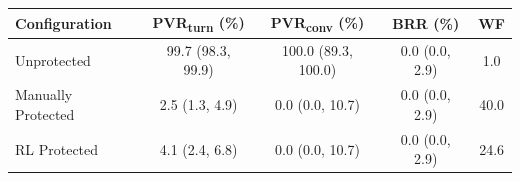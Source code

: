 \begin{tabular}{lcccc}
\toprule
\textbf{Configuration} & \textbf{PVR\textsubscript{turn} (\%)} & \textbf{PVR\textsubscript{conv} (\%)} & \textbf{BRR (\%)} & \textbf{WF} \\
\midrule
  Unprotected & 99.7 (98.3, 99.9) & 100.0 (89.3, 100.0) & 0.0 (0.0, 2.9) & 1.0 \\
  Manually Protected & 2.5 (1.3, 4.9) & 0.0 (0.0, 10.7) & 0.0 (0.0, 2.9) & 40.0 \\
  RL Protected & 4.1 (2.4, 6.8) & 0.0 (0.0, 10.7) & 0.0 (0.0, 2.9) & 24.6 \\
\bottomrule
\end{tabular}
